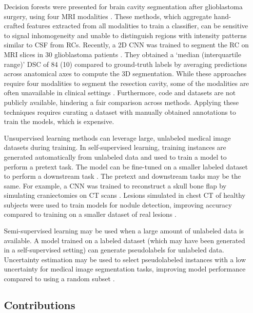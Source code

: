 Decision forests were presented for brain cavity segmentation after glioblastoma surgery, using four \ac{MRI} modalities \cite{meier_automatic_2017}.
These methods, which aggregate hand-crafted features extracted from all  modalities to train a classifier, can be sensitive to signal inhomogeneity and unable to distinguish regions with intensity patterns similar to \ac{CSF} from \acp{RC}.
Recently, a 2D \ac{CNN} was trained to segment the \ac{RC} on \ac{MRI} slices in 30 glioblastoma patients \cite{ermis_fully_2020}.
They obtained a `median (interquartile range)' \ac{DSC} of 84 (10) compared to ground-truth labels by averaging predictions across anatomical axes to compute the 3D segmentation.
While these approaches require four modalities to segment the resection cavity, some of the modalities are often unavailable in clinical settings \cite{dorent_learning_2021}.
Furthermore, code and datasets are not publicly available, hindering a fair comparison across methods.
Applying these techniques requires curating a dataset with manually obtained annotations to train the models, which is expensive.

Unsupervised learning methods can leverage large, unlabeled medical image datasets during training.
In self-supervised learning, training instances are generated automatically from unlabeled data and used to train a model to perform a pretext task. %
The model can be fine-tuned on a smaller labeled dataset to perform a downstream task \cite{chen_self-supervised_2019}.
The pretext and downstream tasks may be the same.
For example, a \ac{CNN} was trained to reconstruct a skull bone flap by simulating craniectomies on CT scans \cite{matzkin_self-supervised_2020}.
Lesions simulated in chest CT of healthy subjects were used to train models for nodule detection, improving accuracy compared to training on a smaller dataset of real lesions \cite{pezeshk_seamless_2017}.

Semi-supervised learning may be used when a large amount of unlabeled data is available.
A model trained on a labeled dataset (which may have been generated in a self-supervised setting) can generate pseudolabels for unlabeled data.
Uncertainty estimation may be used to select pseudolabeled instances with a low uncertainty for medical image segmentation tasks, improving model performance compared to using a random subset \cite{venturini_uncertainty_2020}.


\subsection{Contributions}

